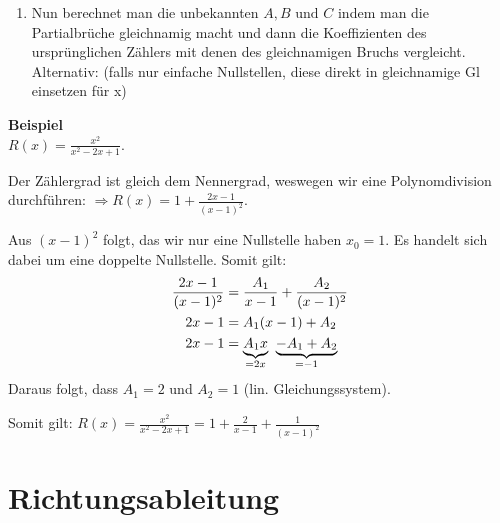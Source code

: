 \begin{enumerate}[leftmargin=*]
\begin{enumerate}[leftmargin=0.3cm]
		
	\end{enumerate}
	\item Nun berechnet man die unbekannten $A, B \text{ und } C$ indem man die Partialbrüche
	gleichnamig macht und dann die Koeffizienten des ursprünglichen Zählers mit
	denen des gleichnamigen Bruchs vergleicht. Alternativ: (falls nur einfache Nullstellen, diese 
	direkt in gleichnamige Gl einsetzen für x)
\end{enumerate}
\begin{footnotesize}
\textbf{Beispiel}\\
$R(x) = \frac{x^2}{x^2-2x+1}$.

Der Zählergrad ist gleich dem Nennergrad,
weswegen wir eine Polynomdivision durchführen: $\Rightarrow R(x) = 1 +
\frac{2x-1}{(x-1)^2}$.

Aus $(x-1)^2$ folgt, das wir nur eine Nullstelle haben $x_0 = 1$. Es handelt
sich dabei um eine doppelte Nullstelle. Somit gilt:
\begin{align*}
\frac{2x-1}{(x-1)^2} &= \frac{A_1}{x-1} + \frac{A_2}{(x-1)^2}\\
2x-1 &= A_1(x-1) + A_2\\
2x-1 &= \underset{= 2x}{\underbrace{A_1 x}} \;\; \underset{= -1 }{\underbrace{- A_1 + A_2}}
\end{align*}
Daraus folgt, dass $A_1 = 2$ und $A_2 = 1$ (lin. Gleichungssystem).

Somit gilt: $R(x) = \frac{x^2}{x^2-2x+1} = 1 + \frac{2}{x-1} +
\frac{1}{(x-1)^2}$
\end{footnotesize}
\section {Richtungsableitung}
